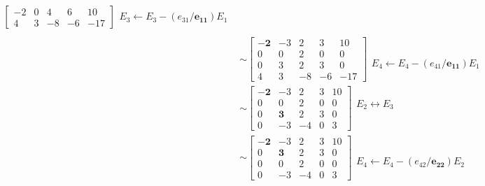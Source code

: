 \begin{ex}
\begin{align}
\begin{bmatrix}
    -2 & 0 & 4 & 6 & 10\\
    4 & 3 & -8 & -6 & -17
  \end{bmatrix}
  \begin{matrix}
  \\
  \\
  E_3\leftarrow E_3 - (e_{31}/\pmb{e_{11}})E_1\\
  \\
  \end{matrix}\\
  &\sim 
  \begin{bmatrix}
    \pmb{-2} & -3 & 2 & 3 & 10\\
    0 & 0 & 2 & 0 & 0\\
    0 & 3 & 2 & 3 & 0\\
    4 & 3 & -8 & -6 & -17
  \end{bmatrix}
  \begin{matrix}
  \\
  \\
  \\
  E_4\leftarrow E_4 - (e_{41}/\pmb{e_{11}})E_1\\
  \end{matrix}\\  
&\sim 
  \begin{bmatrix}
    \pmb{-2} & -3 & 2 & 3 & 10\\
    0 & 0 & 2 & 0 & 0\\
    0 & \pmb{3} & 2 & 3 & 0\\
    0 & -3 & -4 & 0 & 3
  \end{bmatrix}
  \begin{matrix}
  \\
  E_2 \leftrightarrow E_3\\
  \\
  \\
  \end{matrix}\\
&\sim 
  \begin{bmatrix}
    \pmb{-2} & -3 & 2 & 3 & 10\\
    0 & \pmb{3} & 2 & 3 & 0\\
    0 & 0 & 2 & 0 & 0\\
    0 & -3 & -4 & 0 & 3
  \end{bmatrix}
  \begin{matrix}
  \\
  \\
  \\
  E_4 \leftarrow E_4 - (e_{42}/\pmb{e_{22}})E_2\\
  \end{matrix}\\

\end{align}
\end{ex}
